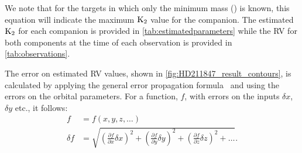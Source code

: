 We note that for the targets in which only the minimum mass (\Mtwosini) is known, this equation will indicate the maximum \(\textrm{K}_{2}\) value for the companion.
The estimated \(\textrm{K}_{2}\) for each companion is provided in \cref{tab:estimatedparameters} while the {RV} for both components at the time of each observation is provided in \cref{tab:observations}.


The error on estimated {RV} values, shown in \cref{fig:HD211847_result_contours}, is calculated by applying the general error propagation formula~\citep{ku_notes_1966} and using the errors on the orbital parameters.
For a function, \(f\), with errors on the inputs \(\delta x\), \(\delta y\) etc., it follows:
\begin{align}
f &= f(x, y, z, \ldots)\\
\delta f &= \sqrt{{\left( \frac{\partial f}{\partial x} \delta x\right)}^2 + {\left(\frac{\partial f}{\partial y} \delta y\right)}^2 + {\left(\frac{\partial f}{\partial z} \delta z\right)}^2 + \ldots}.
\end{align}






